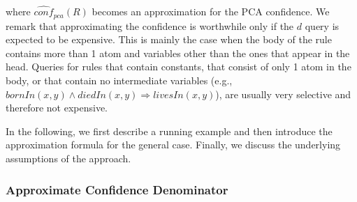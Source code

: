 {\noindent where $\widehat{conf}_{pca}(R)$ becomes an approximation for the PCA confidence.
We remark that approximating the confidence
is worthwhile only if the $d$ query is expected to be expensive.
This is mainly the case when the body of the rule contains more than 1 atom and variables other than the ones that appear in the head. %
Queries for rules that contain constants, that consist of only 1 atom in the body, or that contain no intermediate variables (e.g., $bornIn(x,y) \wedge diedIn(x,y) \Rightarrow livesIn(x,y)$), are usually very selective and therefore not expensive.

In the following, we first describe a running example  and then introduce the approximation formula for the general case.
Finally, we discuss the underlying assumptions of the approach.

\subsubsection{Approximate Confidence Denominator}

}
